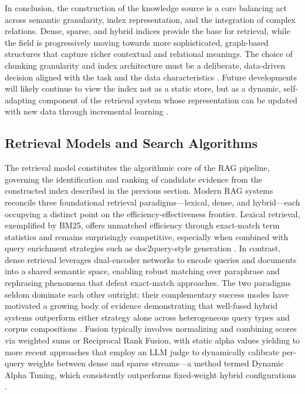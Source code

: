 \documentclass[11pt,a4paper]{article}
\begin{document}
In conclusion, the construction of the knowledge source is a core balancing act across semantic granularity, index representation, and the integration of complex relations. Dense, sparse, and hybrid indices provide the base for retrieval, while the field is progressively moving towards more sophisticated, graph-based structures that capture richer contextual and relational meanings. The choice of chunking granularity and index architecture must be a deliberate, data-driven decision aligned with the task and the data characteristics \cite{arxiv:2605.27445v1}. Future developments will likely continue to view the index not as a static store, but as a dynamic, self-adapting component of the retrieval system whose representation can be updated with new data through incremental learning \cite{arxiv:2501.07063v1}.


\subsection{Retrieval Models and Search Algorithms}


The retrieval model constitutes the algorithmic core of the RAG pipeline, governing the identification and ranking of candidate evidence from the constructed index described in the previous section. Modern RAG systems reconcile three foundational retrieval paradigms---lexical, dense, and hybrid---each occupying a distinct point on the efficiency-effectiveness frontier. Lexical retrieval, exemplified by BM25, offers unmatched efficiency through exact-match term statistics and remains surprisingly competitive, especially when combined with query enrichment strategies such as doc2query-style generation \cite{arxiv:2410.12837v1}. In contrast, dense retrieval leverages dual-encoder networks to encode queries and documents into a shared semantic space, enabling robust matching over paraphrase and rephrasing phenomena that defeat exact-match approaches. The two paradigms seldom dominate each other outright; their complementary success modes have motivated a growing body of evidence demonstrating that well-fused hybrid systems outperform either strategy alone across heterogeneous query types and corpus compositions \cite{arxiv:1805.01800v1,arxiv:2510.12323v1}. Fusion typically involves normalizing and combining scores via weighted sums or Reciprocal Rank Fusion, with static alpha values yielding to more recent approaches that employ an LLM judge to dynamically calibrate per-query weights between dense and sparse streams---a method termed Dynamic Alpha Tuning, which consistently outperforms fixed-weight hybrid configurations \cite{arxiv:1801.04992v2}.
\end{document}
